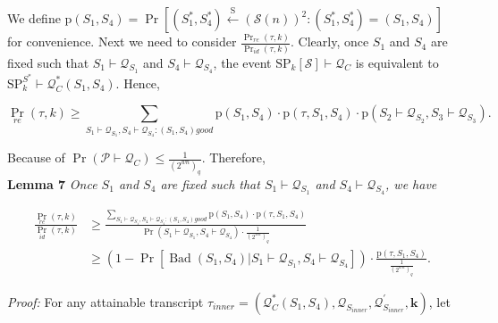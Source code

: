 We define $\mathrm{p}\left(S_{1}, S_{4}\right) = \operatorname{Pr}\left[\left(S_{1}^{*}, S_{4}^{*}\right)
\stackrel{\mathrm{S}}{\leftarrow}(\mathcal{S}(n))^{2}: \left(S_{1}^{*}, S_{4}^{*}\right)=\left(S_{1}, S_{4}\right)\right]$ for convenience. Next we need to consider  $\frac{\operatorname{Pr}_{r e}(\tau, k)}{\operatorname{Pr}_{i d}(\tau, k)}$. Clearly, once $S_{1}$ and $S_{4}$ are fixed such that $S_{1} \vdash \mathcal{Q}_{S_{1}}$ and $S_{4} \vdash \mathcal{Q}_{S_{4}}$, the event
$\mathrm{SP}_{k}[\mathcal{S}] \vdash \mathcal{Q}_{C}$ is equivalent to $\mathrm{SP}_{k}^{S^{*}} \vdash \mathcal{Q}_{C}^{*}\left(S_{1}, S_{4}\right)$. Hence,

$$
\operatorname{Pr}_{r e}(\tau, k) \geq \sum_{S_{1} \vdash \mathcal{Q}_{S_{1}}, S_{4} \vdash \mathcal{Q}_{S_{4}}:\left(S_{1}, S_{4}\right) good }
\mathrm{p}\left(S_{1}, S_{4}\right) \cdot \mathrm{p}\left(\tau, S_{1}, S_{4}\right) \cdot \mathrm{p}\left(S_{2} \vdash \mathcal{Q}_{S_{2}},S_{3} \vdash \mathcal{Q}_{S_{3}}\right).
$$

\noindent Because of $\operatorname{Pr} (\mathcal{P}  \vdash \mathcal{Q}_{C}) \le \frac{1}{\left(2^{w n}\right)_{q}}$. Therefore,\\

\noindent \textbf{Lemma 7} \emph{Once $S_{1}$ and $S_{4}$ are fixed such that $S_{1} \vdash \mathcal{Q}_{S_{1}}$ and $S_{4} \vdash \mathcal{Q}_{S_{4}}$, we have}

\begin{equation}
\begin{aligned}
\frac{\operatorname{Pr}_{r e}(\tau, k)}{\operatorname{Pr}_{i d}(\tau, k)} &\geq \frac{\sum_{S_{1} \vdash \mathcal{Q}_{S_{1}}, S_{4} \vdash \mathcal{Q}_{S_{4}}: \left(S_{1}, S_{4}\right)good } \mathrm{p}\left(S_{1}, S_{4}\right) \cdot \mathrm{p}\left(\tau, S_{1}, S_{4}\right)}{\operatorname{Pr}(S_{1} \vdash \mathcal{Q}_{S_{1}}, S_{4} \vdash \mathcal{Q}_{S_{4}}) \cdot \frac{1}{\left(2^{w n}\right)_{q}}}\\
&\geq \left(1-\operatorname{Pr}\left[\operatorname{Bad}\left(S_{1},S_{4}\right) | S_{1} \vdash \mathcal{Q}_{S_{1}}, S_{4} \vdash \mathcal{Q}_{S_{4}}\right]\right) \cdot
\frac{\mathrm{p}\left(\tau, S_{1}, S_{4}\right)}{\frac{1}{\left(2^{w n}\right)_{q}}}.
\end{aligned}
\end{equation}

\noindent \emph{Proof:} For any attainable transcript $\tau_{inner}=\left(\mathcal{Q}_{C}^{*}\left(S_{1},S_{4}\right), \mathcal{Q}_{S_{inner}}, \mathcal{Q}_{S_{inner}}^{\prime}, \mathbf{k}\right)$, let

